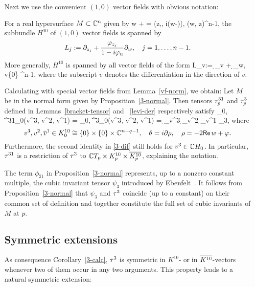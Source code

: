 \documentclass[12pt]{amsart}
\begin{document}
Next we use the convenient $(1,0)$ vector fields with obvious notation:

\bl{}
For a real hypersurface $M\subset {\mathbb{C}}^{n}$ given by
\beq{}
	w + \w = \phi(z,\z, i(w-\w)), \quad (w, z)\in\C\times \C^{n-1},
\eeq
the subbundle $H^{10}$ of $(1,0)$ vector fields is spanned by
$$
	L_j := \partial_{z_j} + \frac{\varphi_{z_j}}{1-i\varphi_u} \partial_w, 
	\quad 
	j=1,\ldots, n-1.
$$
More generally, $H^{10}$ is spanned by all vector fields of the form
\beq{}
	L_v:= \d_v +  \d_w, 
	\quad v\in \{0\} \times \C^{n-1},
\eeq
where the subscript $v$ denotes the differentiation in the direction of $v$.
\el



Calculating with special vector fields from Lemma~\ref{vf-norm}, we obtain:
\bc{}
Let $M$ be in the normal form given by Proposition~\ref{3-normal}.
Then tensors $\tau^{31}_p$ and $\tau^3_p$ defined in Lemmas~\ref{bracket-tensor}
and ~\ref{levi-der} respectively satisfy
\beq{}
	\la \th_0,  \t^{31}_0(v^3, v^2, v^1) \ra
	=
	\la \th_0,  \t^3_0(v^3, v^2, v^1) \ra
	= \d_{v^3} \d_{v^2} \d_{v^1} \phi_3,
\eeq
where
$$
	v^3, v^2, \overline{v}^1 \in K^{10}_0 \cong \{0\}\times \{0\} \times {\mathbb{C}}^{n-q-1},
	\quad
	\theta=i \partial\rho, 
	\quad
	\rho =-2{\sf Re}\, w + \varphi.
$$
Furthermore, the second identity in \eqref{3-dif} still holds for $v^3\in {\mathbb{C}} H_0$.
\ec
In particular,
$\tau^{31}$ is a restriction of $\tau^3$ 
to ${\mathbb{C}} T_p \times  K^{10}_p \times \overline{K^{10}_p}$,
explaining the notation.


\br
The term $\phi_{21}$ in Proposition~\ref{3-normal}
represents, up to a nonzero constant multiple,
the cubic invariant tensor 
$\psi_3$ 
introduced by Ebenfelt~\cite{E-jdg}.
It follows from Proposition~\ref{3-normal}
that $\psi_3$ and $\tau^3$
coincide (up to a constant) on their common set of definition
and together
constitute the full set of cubic invariants of $M$ at $p$.
\er



\subsection{Symmetric extensions}
As consequence Corollary~\ref{3-calc},
$\tau^3$ is symmetric in
$K^{10}$- or in $\overline{K^{10}}$-vectors
whenever two of them occur in any two arguments.
This property leads to a natural symmetric extension:
\end{document}
